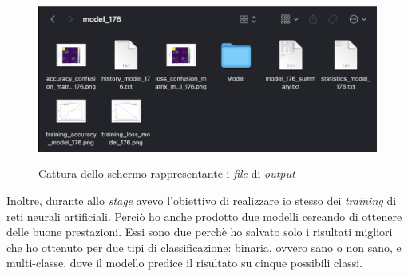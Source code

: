 \begin{figure}[H]
    \centering
    \includegraphics[alt={Cattura dello schermo rappresentante i \textit{file} di \textit{output}}, width=0.9\columnwidth]{img/output.png}
    \caption{\centering Cattura dello schermo rappresentante i \textit{file} di \textit{output}}
    \label{fig:output}
\end{figure}\noindent
Inoltre, durante allo \textit{stage} avevo l'obiettivo di realizzare io stesso dei \textit{training} di reti neurali artificiali.
Perciò ho anche prodotto due modelli cercando di ottenere delle buone prestazioni. Essi sono due perchè ho salvato solo i risultati migliori che ho ottenuto per due tipi di classificazione: binaria, ovvero sano o non sano, e multi-classe, dove il modello predice il risultato su cinque possibili classi.

